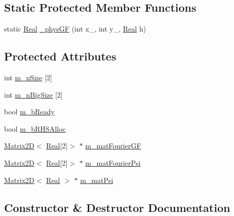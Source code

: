 \subsection*{Static Protected Member Functions}
\begin{DoxyCompactItemize}
\item 
static \hyperlink{_h_d_f5_dumper_8h_a445a5f0e2a34c9d97d69a3c2d1957907}{Real} \hyperlink{class_velocity_solver___unbounded_a3d4f3335a5457ac8c5a8d80797048223}{\+\_\+phys\+G\+F} (int x\+\_\+, int y\+\_\+, \hyperlink{_h_d_f5_dumper_8h_a445a5f0e2a34c9d97d69a3c2d1957907}{Real} h)
\end{DoxyCompactItemize}
\subsection*{Protected Attributes}
\begin{DoxyCompactItemize}
\item 
int \hyperlink{class_velocity_solver___unbounded_a5a06247f4313780a5cb906d64bcd8f80}{m\+\_\+n\+Size} \mbox{[}2\mbox{]}
\item 
int \hyperlink{class_velocity_solver___unbounded_a8ef48a7fe2c413d388a5145a37716452}{m\+\_\+n\+Big\+Size} \mbox{[}2\mbox{]}
\item 
bool \hyperlink{class_velocity_solver___unbounded_ab4e11619c97d2ebfe551bed262118ab9}{m\+\_\+b\+Ready}
\item 
bool \hyperlink{class_velocity_solver___unbounded_a83aaa5f4615df58cfe939d661075f959}{m\+\_\+b\+R\+H\+S\+Alloc}
\item 
\hyperlink{class_matrix2_d}{Matrix2\+D}$<$ \hyperlink{_h_d_f5_dumper_8h_a445a5f0e2a34c9d97d69a3c2d1957907}{Real}\mbox{[}2\mbox{]}$>$ $\ast$ \hyperlink{class_velocity_solver___unbounded_a11158418be011c0978f050fd74a04482}{m\+\_\+mat\+Fourier\+G\+F}
\item 
\hyperlink{class_matrix2_d}{Matrix2\+D}$<$ \hyperlink{_h_d_f5_dumper_8h_a445a5f0e2a34c9d97d69a3c2d1957907}{Real}\mbox{[}2\mbox{]}$>$ $\ast$ \hyperlink{class_velocity_solver___unbounded_afcbee94365c2da82320e79181c8387b2}{m\+\_\+mat\+Fourier\+Psi}
\item 
\hyperlink{class_matrix2_d}{Matrix2\+D}$<$ \hyperlink{_h_d_f5_dumper_8h_a445a5f0e2a34c9d97d69a3c2d1957907}{Real} $>$ $\ast$ \hyperlink{class_velocity_solver___unbounded_afa889bd25dd44eb07f9aab6b0b0cd840}{m\+\_\+mat\+Psi}
\end{DoxyCompactItemize}


\subsection{Constructor \& Destructor Documentation}
\hypertarget{class_velocity_solver___unbounded_a2a4f55337c05bd3e5a98d732d4524031}{}
